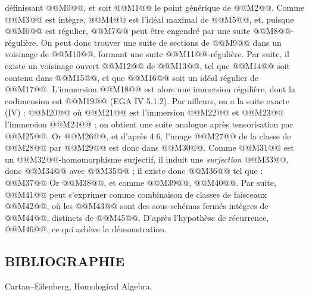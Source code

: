 
définissant @@M0@@, et soit @@M1@@ le point générique de @@M2@@. Comme @@M3@@ est intègre, @@M4@@ est l'idéal maximal de @@M5@@, et, puisque @@M6@@ est régulier, @@M7@@ peut être engendré par une suite @@M8@@-régulière. On peut donc trouver une suite de sections de @@M9@@ dans un voisinage de @@M10@@, formant une suite @@M11@@-régulière. Par suite, il existe un voisinage ouvert @@M12@@ de @@M13@@, tel que @@M14@@ soit contenu dans @@M15@@, et que @@M16@@ soit un idéal régulier de @@M17@@. L'immersion @@M18@@ est alors une immersion régulière, dont la codimension est @@M19@@ (EGA IV 5.1.2). Par ailleurs, on a la suite exacte (IV\qquad) :
@@M20@@
où @@M21@@ est l'immersion @@M22@@ et @@M23@@ l'immersion @@M24@@ ; on obtient une suite analogue après tensorisation par @@M25@@. Or @@M26@@, et d'après 4.6, l'image @@M27@@ de la classe de @@M28@@ par @@M29@@ est donc dans @@M30@@. Comme @@M31@@ est un @@M32@@-homomorphisme surjectif, il induit une \emph{surjection} @@M33@@, donc @@M34@@ avec @@M35@@ ; il existe donc @@M36@@ tel que :
@@M37@@
Or @@M38@@, et comme @@M39@@, @@M40@@. Par suite, @@M41@@ peut s'exprimer comme combinaison de classes de faisceaux @@M42@@, où les @@M43@@ sont des sous-schémas fermés intègres de @@M44@@, distincts de @@M45@@. D'après l'hypothèse de récurrence, @@M46@@, ce qui achève la démonstration.

\subsection*{BIBLIOGRAPHIE}
\begin{enumerate}[label={[\arabic*]}]
\item Cartan--Eilenberg, Homological Algebra.
\end{enumerate}



\providecommand{\etale}{\'etale}
\providecommand{\Ch}{\operatorname{Ch}}


